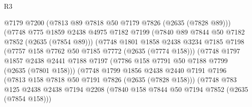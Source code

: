 \begin{lexlean}{R3}
\begin{coremodule}
                                    @7179
                                    @7200
                                    (@7813 @89 @7818 @50 @7179 @7826 (@2635 (@7828 @89)))
                                    (@7748
                                      @775
                                      @1859
                                      @2438
                                      @4975
                                      @7182
                                      @7199
                                      (@7840 @89 @7844 @50 @7182 @7852 (@2635 (@7854 @89)))
                                      (@7748
                                        @1801
                                        @1858
                                        @2438
                                        @3234
                                        @7185
                                        @7198
                                        (@7757 @158 @7762 @50 @7185 @7772 (@2635 (@7774 @158)))
                                        (@7748
                                          @1797
                                          @1857
                                          @2438
                                          @2441
                                          @7188
                                          @7197
                                          (@7786 @158 @7791 @50 @7188 @7799 (@2635 (@7801 @158)))
                                          (@7748
                                            @1799
                                            @1856
                                            @2438
                                            @2440
                                            @7191
                                            @7196
                                            (@7813 @158 @7818 @50 @7191 @7826 (@2635 (@7828 @158)))
                                            (@7748
                                              @783
                                              @125
                                              @2438
                                              @2438
                                              @7194
                                              @2208
                                              (@7840
                                                @158
                                                @7844
                                                @50
                                                @7194
                                                @7852
                                                (@2635 (@7854 @158)))

\end{coremodule}
\end{lexlean}
